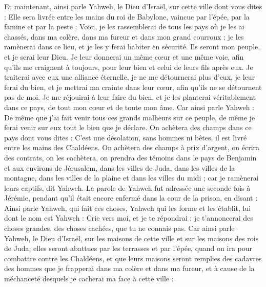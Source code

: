 \begin{multicols}{2}
Et maintenant, ainsi parle Yahweh, le Dieu d'Israël, sur cette ville dont vous dites : Elle sera livrée entre les mains du roi de Babylone, vaincue par l'épée, par la famine et par la peste :
Voici, je les rassemblerai de tous les pays où je les ai chassés, dans ma colère, dans ma fureur et dans mon grand courroux ;  je les ramènerai dans ce lieu, et je les y ferai habiter en sécurité.
Ils seront mon peuple, et je serai leur Dieu.
Je leur donnerai un même cœur et une même voie, afin qu'ils me craignent à toujours, pour leur bien et celui de leurs fils après eux.
Je traiterai avec eux une alliance éternelle, je ne me détournerai plus d'eux, je leur ferai du bien, et je mettrai ma crainte dans leur cœur, afin qu'ils ne se détournent pas de moi.
Je me réjouirai à leur faire du bien, et je les planterai véritablement dans ce pays, de tout mon cœur et de toute mon âme.
Car ainsi parle Yahweh : De même que j'ai fait venir tous ces grands malheurs sur ce peuple, de même je ferai venir sur eux tout le bien que je déclare.
On achètera des champs dans ce pays dont vous dites : C’est une désolation, sans hommes ni bêtes, il est livré entre les mains des Chaldéens.
On achètera des champs à prix d'argent, on écrira des contrats, on les cachètera, on prendra des témoins dans le pays de Benjamin et aux environs de Jérusalem, dans les villes de Juda, dans les villes de la montagne, dans les villes de la plaine et dans les villes du midi ; car je ramènerai leurs captifs, dit Yahweh.
\VerseOne{}La parole de Yahweh fut adressée une seconde fois à Jérémie, pendant qu’il était encore enfermé dans la cour de la prison, en disant :
Ainsi parle Yahweh, qui fait ces choses, Yahweh qui les forme et les établit, lui dont le nom est Yahweh :
Crie vers moi, et je te répondrai ; je t’annoncerai des choses grandes, des choses cachées, que tu ne connais pas.
Car ainsi parle Yahweh, le Dieu d'Israël, sur les maisons de cette ville et sur les maisons des rois de Juda, elles seront abattues par les terrasses et par l'épée,
quand on ira pour combattre contre les Chaldéens, et que leurs maisons seront remplies des cadavres des hommes que je frapperai dans ma colère et dans ma fureur, et à cause de la méchanceté desquels je cacherai ma face à cette ville :

\end{multicols}
